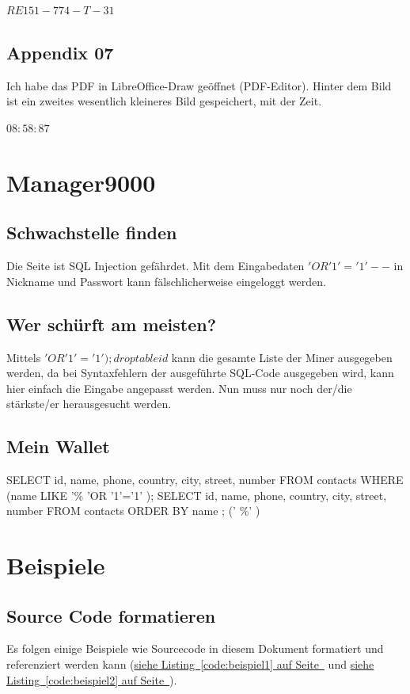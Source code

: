 \documentclass[12pt,a4paper,titlepage,oneside]{scrartcl}
\begin{document}
$RE151-774-T-31$


\subsection{Appendix 07}
Ich habe das PDF in LibreOffice-Draw geöffnet (PDF-Editor).
Hinter dem Bild ist ein zweites wesentlich kleineres Bild gespeichert, mit der Zeit.

$08:58:87$


\section{Manager9000}

\subsection{Schwachstelle finden}
Die Seite ist SQL Injection gefährdet. Mit dem Eingabedaten $' OR '1'='1' --$ in Nickname und Passwort kann fälschlicherweise eingeloggt werden.

\subsection{Wer schürft am meisten?}
Mittels $' OR '1'='1' );  drop table id$  kann die gesamte Liste der Miner ausgegeben werden, da bei Syntaxfehlern der ausgeführte SQL-Code ausgegeben wird, kann hier einfach die Eingabe angepasst werden. Nun muss nur noch der/die stärkste/er herausgesucht werden.

\subsection{Mein Wallet}

SELECT id, name, phone, country, city, street, number FROM contacts WHERE (name LIKE '\%
'OR '1'='1' ); SELECT id, name, phone, country, city, street, number FROM contacts ORDER BY name ;
('
\%' )

\section{Beispiele}

\subsection{Source Code formatieren}
Es folgen einige Beispiele wie Sourcecode in diesem Dokument formatiert und referenziert werden kann
(\hyperref[code:beispiel1]{siehe Listing~\ref*{code:beispiel1} auf Seite~\pageref*{code:beispiel1}} und \hyperref[code:beispiel2]{siehe Listing~\ref*{code:beispiel2} auf Seite~\pageref*{code:beispiel2}}).
\end{document}
